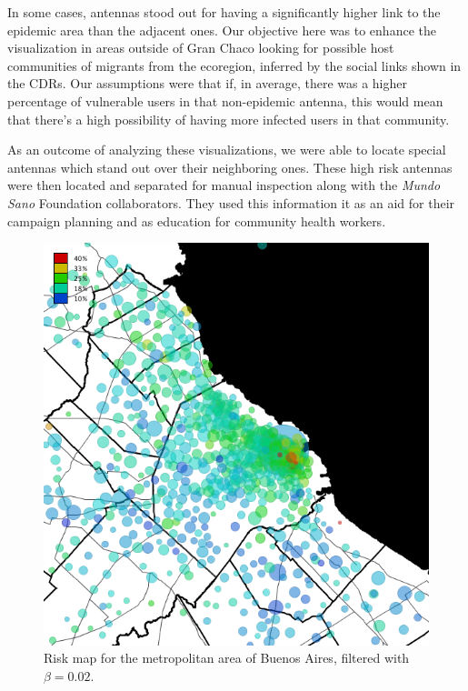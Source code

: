 In some cases, antennas stood out for having a significantly higher link to the epidemic area than the adjacent ones.
Our objective here was to enhance the visualization in areas outside of Gran Chaco looking for possible host communities of migrants from the ecoregion, inferred by the social links shown in the CDRs.
Our assumptions were that if, in average, there was a higher percentage of vulnerable users in that non-epidemic antenna, this would mean that there's a high possibility of having more infected users in that community.

As an outcome of analyzing these visualizations, we were able to locate special antennas which stand out over their neighboring ones.
These high risk antennas were then located and separated for manual inspection along with the \textit{Mundo Sano} Foundation collaborators.
They used this information it as an aid for their campaign planning and as education for community health workers.


\begin{figure}[p]
	\caption{Risk map for the metropolitan area of Buenos Aires, filtered with $\beta = 0.02$.}\label{fig:amba_map}
	\centering
	\includegraphics[width=0.65\linewidth]
	{figures/201112_hi_res_amba_usuarios_proporcion_circulos_beta2/201112_hi_res_amba_usuarios_proporcion_circulos_beta2}
\end{figure}

